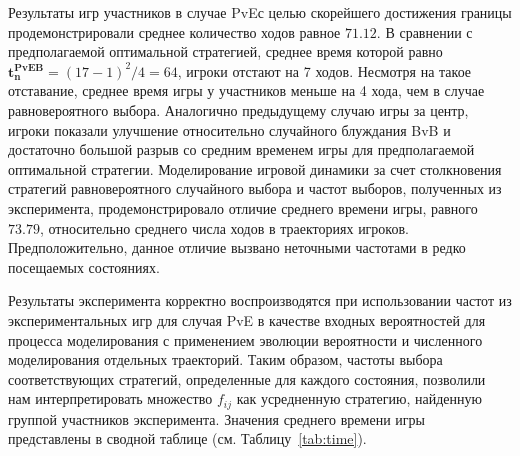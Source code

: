 Результаты игр участников в случае PvEс целью скорейшего достижения границы продемонстрировали среднее количество ходов равное $71.12$.
В сравнении с предполагаемой оптимальной стратегией, среднее время которой равно $\boldsymbol{t_n^{PvE B}} = (17-1)^2/4 = 64$, игроки 
отстают на 7 ходов. Несмотря на такое отставание, среднее время игры у участников меньше на 4 хода, чем в случае равновероятного выбора. 
Аналогично предыдущему случаю игры за центр, игроки показали улучшение относительно случайного блуждания BvB и достаточно большой разрыв со средним временем игры
для предполагаемой оптимальной стратегии. Моделирование игровой динамики за счет столкновения стратегий равновероятного случайного выбора и 
частот выборов, полученных из эксперимента, продемонстрировало отличие среднего времени игры, равного $73.79$, относительно среднего числа ходов в траекториях игроков.
Предположительно, данное отличие вызвано неточными частотами в редко посещаемых состояниях. 

Результаты эксперимента корректно воспроизводятся при использовании частот из экспериментальных игр для случая PvE в
качестве входных вероятностей для процесса моделирования с применением эволюции вероятности и численного моделирования отдельных траекторий. 
Таким образом, частоты выбора соответствующих стратегий, определенные для каждого состояния, позволили нам интерпретировать множество $f_{ij}$ как усредненную стратегию, 
найденную группой участников эксперимента. Значения среднего времени игры представлены в сводной таблице (см. Таблицу~\cref{tab:time}).

